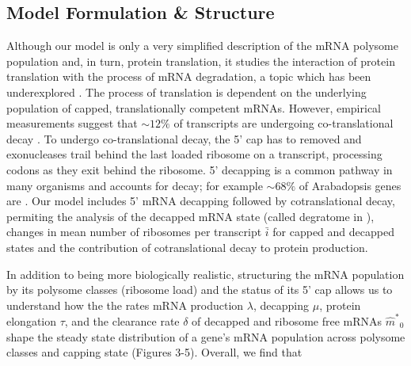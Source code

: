 \documentclass[a4,center,fleqn]{NAR}
\newcommand\mmpar[1]{\marginpar{\begin{spacing}{0.7}\raggedright \singlespacing \tiny \textbf{M:} #1 \end{spacing}}}  %
\newcommand{\mhat}{\ensuremath{\hat{m}}\xspace}
\newcommand{\mhatstar}{\ensuremath{\mhat^{*}}\xspace}
\newcommand{\MRL}{\ensuremath{\bar{i}}\xspace}
\begin{document}
\subsection{Model Formulation \& Structure}

Although our model is only a very simplified description of the mRNA polysome population and, in turn, protein translation, it studies the interaction of protein translation with the process of mRNA degradation, a topic which has been underexplored \citep{RN11}. The process of translation is dependent on the underlying population of capped, translationally competent mRNAs. However, empirical measurements suggest that $\sim 12\%$ of transcripts are undergoing co-translational decay \citep{RN4}. To undergo co-translational decay, the 5' cap has to removed and exonucleases trail behind the last loaded ribosome on a transcript, processing codons as they exit behind the ribosome. 5' decapping is a common pathway in many organisms and accounts for decay; for example $\sim 68\%$ of Arabadopsis genes are \citep{RN28}.
Our model includes 5' mRNA decapping followed by cotranslational decay, permiting the analysis of the decapped mRNA state (called degratome in \citep{RN34}), changes in mean number of ribosomes per transcript \MRL for capped and decapped states and the contribution of cotranslational decay to protein production.

In addition to being more biologically realistic, structuring the mRNA population by its polysome classes (ribosome load) and the status of its 5' cap allows us to understand how the the rates mRNA production $\lambda$, decapping $\mu$, protein elongation $\tau$, and the clearance rate $\delta$ of decapped and ribosome free mRNAs $\mhatstar_0$ shape the steady state distribution of a gene's mRNA population across polysome classes and capping state (Figures 3-5).
Overall, we find that 
\end{document}
